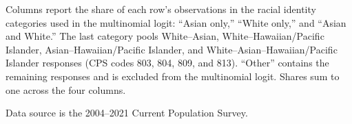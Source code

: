 \begin{table}[H]
\begin{threeparttable}
\begin{tablenotes}
\item[2] Columns report the share of each row's observations in the racial identity categories used in the multinomial logit: ``Asian only,'' ``White only,'' and ``Asian and White.'' The last category pools White--Asian, White--Hawaiian/Pacific Islander, Asian--Hawaiian/Pacific Islander, and White--Asian--Hawaiian/Pacific Islander responses (CPS codes 803, 804, 809, and 813). ``Other'' contains the remaining responses and is excluded from the multinomial logit. Shares sum to one across the four columns.
\item[3] Data source is the 2004--2021 Current Population Survey.
\end{tablenotes}
\end{threeparttable}
\end{table}
